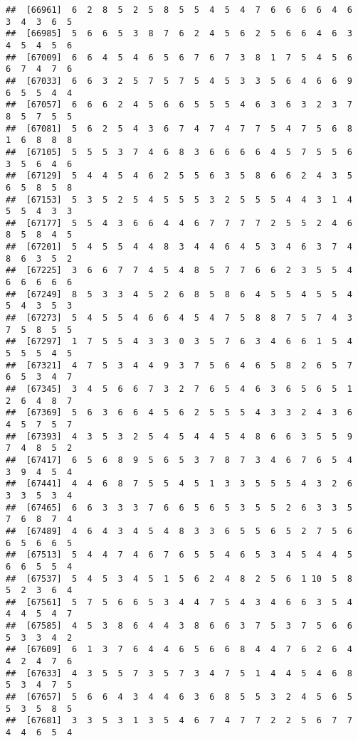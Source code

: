 \documentclass[
]{book}
\begin{document}
\begin{verbatim}
##  [66961]  6  2  8  5  2  5  8  5  5  4  5  4  7  6  6  6  6  4  6  3  4  3  6  5
##  [66985]  5  6  6  5  3  8  7  6  2  4  5  6  2  5  6  6  4  6  3  4  5  4  5  6
##  [67009]  6  6  4  5  4  6  5  6  7  6  7  3  8  1  7  5  4  5  6  6  7  4  7  6
##  [67033]  6  6  3  2  5  7  5  7  5  4  5  3  3  5  6  4  6  6  9  6  5  5  4  4
##  [67057]  6  6  6  2  4  5  6  6  5  5  5  4  6  3  6  3  2  3  7  8  5  7  5  5
##  [67081]  5  6  2  5  4  3  6  7  4  7  4  7  7  5  4  7  5  6  8  1  6  8  8  8
##  [67105]  5  5  5  3  7  4  6  8  3  6  6  6  6  4  5  7  5  5  6  3  5  6  4  6
##  [67129]  5  4  4  5  4  6  2  5  5  6  3  5  8  6  6  2  4  3  5  6  5  8  5  8
##  [67153]  5  3  5  2  5  4  5  5  5  3  2  5  5  5  4  4  3  1  4  5  5  4  3  3
##  [67177]  5  5  4  3  6  6  4  4  6  7  7  7  7  2  5  5  2  4  6  8  5  8  4  5
##  [67201]  5  4  5  5  4  4  8  3  4  4  6  4  5  3  4  6  3  7  4  8  6  3  5  2
##  [67225]  3  6  6  7  7  4  5  4  8  5  7  7  6  6  2  3  5  5  4  6  6  6  6  6
##  [67249]  8  5  3  3  4  5  2  6  8  5  8  6  4  5  5  4  5  5  4  5  4  3  5  3
##  [67273]  5  4  5  5  4  6  6  4  5  4  7  5  8  8  7  5  7  4  3  7  5  8  5  5
##  [67297]  1  7  5  5  4  3  3  0  3  5  7  6  3  4  6  6  1  5  4  5  5  5  4  5
##  [67321]  4  7  5  3  4  4  9  3  7  5  6  4  6  5  8  2  6  5  7  6  5  3  4  7
##  [67345]  3  4  5  6  6  7  3  2  7  6  5  4  6  3  6  5  6  5  1  2  6  4  8  7
##  [67369]  5  6  3  6  6  4  5  6  2  5  5  5  4  3  3  2  4  3  6  4  5  7  5  7
##  [67393]  4  3  5  3  2  5  4  5  4  4  5  4  8  6  6  3  5  5  9  7  4  8  5  2
##  [67417]  6  5  6  8  9  5  6  5  3  7  8  7  3  4  6  7  6  5  4  3  9  4  5  4
##  [67441]  4  4  6  8  7  5  5  4  5  1  3  3  5  5  5  4  3  2  6  3  3  5  3  4
##  [67465]  6  6  3  3  3  7  6  6  5  6  5  3  5  5  2  6  3  3  5  7  6  8  7  4
##  [67489]  4  6  4  3  4  5  4  8  3  3  6  5  5  6  5  2  7  5  6  6  5  6  6  5
##  [67513]  5  4  4  7  4  6  7  6  5  5  4  6  5  3  4  5  4  4  5  6  6  5  5  4
##  [67537]  5  4  5  3  4  5  1  5  6  2  4  8  2  5  6  1 10  5  8  5  2  3  6  4
##  [67561]  5  7  5  6  6  5  3  4  4  7  5  4  3  4  6  6  3  5  4  4  4  5  4  7
##  [67585]  4  5  3  8  6  4  4  3  8  6  6  3  7  5  3  7  5  6  6  5  3  3  4  2
##  [67609]  6  1  3  7  6  4  4  6  5  6  6  8  4  4  7  6  2  6  4  4  2  4  7  6
##  [67633]  4  3  5  5  7  3  5  7  3  4  7  5  1  4  4  5  4  6  8  5  3  4  7  5
##  [67657]  5  6  6  4  3  4  4  6  3  6  8  5  5  3  2  4  5  6  5  5  3  5  8  5
##  [67681]  3  3  5  3  1  3  5  4  6  7  4  7  7  2  2  5  6  7  7  4  4  6  5  4

\end{verbatim}
\end{document}

